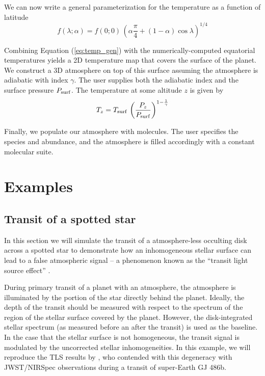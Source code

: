 \documentclass[linenumbers,preprint,authoryear]{elsarticle}
\begin{document}
We can now write a general parameterization for the temperature as a function of latitude
\begin{equation}
    \label{eq:temp_gen}
    f(\lambda;\alpha) = f(0;0)\,\left(\alpha \frac{\pi}{4} + (1-\alpha) \cos{\lambda}\right)^{1/4}
\end{equation}

Combining Equation (\ref{eq:temp_gen}) with the numerically-computed equatorial temperatures yields a 2D temperature map that covers the surface of the planet. We construct a 3D atmosphere on top of this surface assuming the atmosphere is adiabatic with index $\gamma$. The user supplies both the adiabatic index and the surface pressure $P_{\rm surf}$. The temperature at some altitude $z$ is given by
\begin{equation}
    T_z = T_{\rm surf}\,\left( \frac{P_z}{P_{\rm surf}} \right)^{1-\frac{1}{\gamma}}
\end{equation}

Finally, we populate our atmosphere with molecules. The user specifies the species and abundance, and the atmosphere is filled accordingly with a constant molecular suite.

\section{Examples \label{sec:examples}}

\subsection{Transit of a spotted star}

In this section we will simulate the transit of a atmosphere-less occulting disk across a spotted star to demonstrate how an inhomogeneous
stellar surface can lead to a false atmospheric signal -- a phenomenon known as the ``transit light source effect'' \citep{rackham2018}.

During primary transit of a planet with an atmosphere, the atmosphere is illuminated by the portion of the star directly behind the planet. Ideally, the depth of the transit should be measured with respect to the spectrum of the region of the stellar surface covered by the planet. However, the disk-integrated stellar spectrum (as measured before an after the transit) is used as the baseline. In the case that the stellar surface is not homogeneous, the transit signal is modulated by the uncorrected stellar inhomogeneities. In this example, we will reproduce the TLS results by \citet{moran2023}, who contended with this degeneracy with JWST/NIRSpec observations during a transit of super-Earth GJ 486b.
\end{document}
